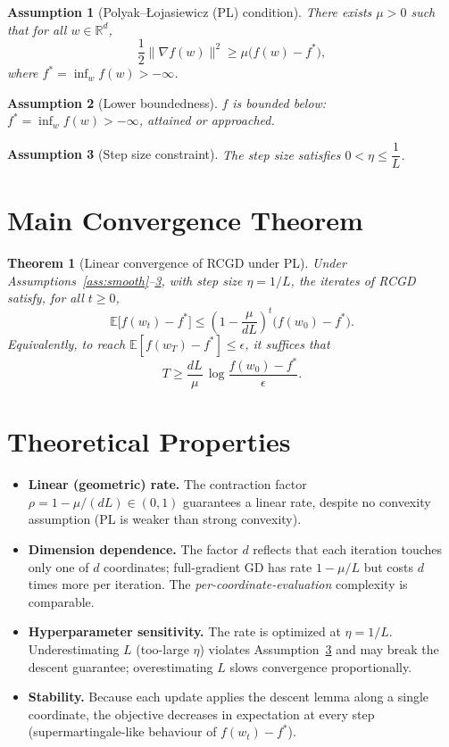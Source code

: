 \documentclass{article}
\newtheorem{theorem}{Theorem}
\newtheorem{assumption}{Assumption}
\begin{document}
\begin{assumption}[Polyak--\L ojasiewicz (PL) condition]
\label{ass:pl}
There exists $\mu > 0$ such that for all $w \in \mathbb{R}^d$,
\[
\frac{1}{2}\|\nabla f(w)\|^2 \ge \mu\big(f(w) - f^*\big),
\]
where $f^* = \inf_w f(w) > -\infty$.
\end{assumption}

\begin{assumption}[Lower boundedness]
\label{ass:lb}
$f$ is bounded below: $f^* = \inf_{w} f(w) > -\infty$, attained or approached.
\end{assumption}

\begin{assumption}[Step size constraint]
\label{ass:step}
The step size satisfies $0 < \eta \le \dfrac{1}{L}$.
\end{assumption}

\section*{Main Convergence Theorem}

\begin{theorem}[Linear convergence of RCGD under PL]
\label{thm:main}
Under Assumptions~\ref{ass:smooth}--\ref{ass:step}, with step size
$\eta = 1/L$, the iterates of RCGD satisfy, for all $t \ge 0$,
\[
\mathbb{E}\big[f(w_t) - f^*\big]
\le \left(1 - \frac{\mu}{dL}\right)^{t} \big(f(w_0) - f^*\big).
\]
Equivalently, to reach $\mathbb{E}[f(w_T)-f^*] \le \epsilon$, it suffices that
\[
T \ge \frac{dL}{\mu}\,\log\!\frac{f(w_0)-f^*}{\epsilon}.
\]
\end{theorem}

\section*{Theoretical Properties}

\begin{itemize}
\item \textbf{Linear (geometric) rate.} The contraction factor
$\rho = 1 - \mu/(dL) \in (0,1)$ guarantees a linear rate, despite no convexity
assumption (PL is weaker than strong convexity).
\item \textbf{Dimension dependence.} The factor $d$ reflects that each iteration
touches only one of $d$ coordinates; full-gradient GD has rate $1-\mu/L$ but
costs $d$ times more per iteration. The \emph{per-coordinate-evaluation}
complexity is comparable.
\item \textbf{Hyperparameter sensitivity.} The rate is optimized at
$\eta = 1/L$. Underestimating $L$ (too-large $\eta$) violates
Assumption~\ref{ass:step} and may break the descent guarantee; overestimating
$L$ slows convergence proportionally.
\item \textbf{Stability.} Because each update applies the descent lemma along a
single coordinate, the objective decreases in expectation at every step
(supermartingale-like behaviour of $f(w_t)-f^*$).
\end{itemize}
\end{document}
